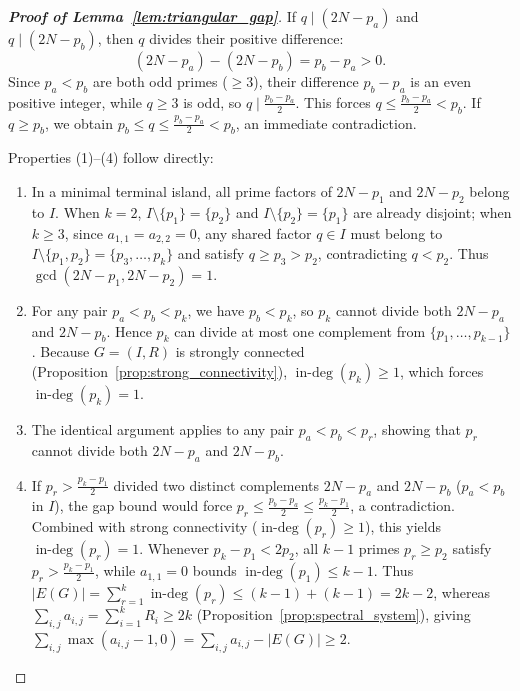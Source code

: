 \documentclass[11pt,a4paper]{article}
\theoremstyle{definition}
\begin{document}
\begin{proof}[\textbf{Proof of Lemma~\ref{lem:triangular_gap}}]
If $q \mid (2N - p_a)$ and $q \mid (2N - p_b)$, then $q$ divides their positive difference:
\[
(2N - p_a) - (2N - p_b) = p_b - p_a > 0.
\]
Since $p_a < p_b$ are both odd primes ($\ge 3$), their difference $p_b - p_a$ is an even positive integer, while $q \ge 3$ is odd, so $q \mid \frac{p_b - p_a}{2}$. This forces $q \le \frac{p_b - p_a}{2} < p_b$. If $q \ge p_b$, we obtain $p_b \le q \le \frac{p_b - p_a}{2} < p_b$, an immediate contradiction.

Properties (1)--(4) follow directly:
\begin{enumerate}
    \item In a minimal terminal island, all prime factors of $2N - p_1$ and $2N - p_2$ belong to $I$. When $k = 2$, $I \setminus \{p_1\} = \{p_2\}$ and $I \setminus \{p_2\} = \{p_1\}$ are already disjoint; when $k \ge 3$, since $a_{1,1} = a_{2,2} = 0$, any shared factor $q \in I$ must belong to $I \setminus \{p_1, p_2\} = \{p_3, \dots, p_k\}$ and satisfy $q \ge p_3 > p_2$, contradicting $q < p_2$. Thus $\gcd(2N - p_1, 2N - p_2) = 1$.
    \item For any pair $p_a < p_b < p_k$, we have $p_b < p_k$, so $p_k$ cannot divide both $2N - p_a$ and $2N - p_b$. Hence $p_k$ can divide at most one complement from $\{p_1, \dots, p_{k-1}\}$. Because $G = (I, R)$ is strongly connected (Proposition~\ref{prop:strong_connectivity}), $\operatorname{in-deg}(p_k) \ge 1$, which forces $\operatorname{in-deg}(p_k) = 1$.
    \item The identical argument applies to any pair $p_a < p_b < p_r$, showing that $p_r$ cannot divide both $2N - p_a$ and $2N - p_b$.
    \item If $p_r > \frac{p_k - p_1}{2}$ divided two distinct complements $2N - p_a$ and $2N - p_b$ ($p_a < p_b$ in $I$), the gap bound would force $p_r \le \frac{p_b - p_a}{2} \le \frac{p_k - p_1}{2}$, a contradiction. Combined with strong connectivity ($\operatorname{in-deg}(p_r) \ge 1$), this yields $\operatorname{in-deg}(p_r) = 1$. Whenever $p_k - p_1 < 2p_2$, all $k - 1$ primes $p_r \ge p_2$ satisfy $p_r > \frac{p_k - p_1}{2}$, while $a_{1,1} = 0$ bounds $\operatorname{in-deg}(p_1) \le k - 1$. Thus $|E(G)| = \sum_{r=1}^k \operatorname{in-deg}(p_r) \le (k - 1) + (k - 1) = 2k - 2$, whereas $\sum_{i,j} a_{i,j} = \sum_{i=1}^k R_i \ge 2k$ (Proposition~\ref{prop:spectral_system}), giving $\sum_{i,j} \max(a_{i,j} - 1, 0) = \sum_{i,j} a_{i,j} - |E(G)| \ge 2$.
\end{enumerate}
\end{proof}
\end{document}
